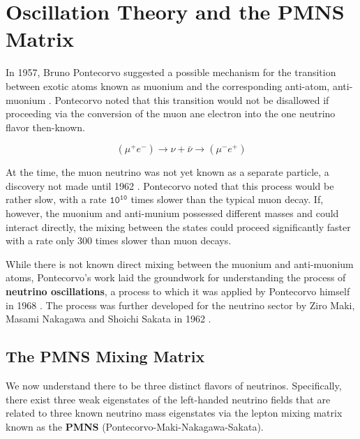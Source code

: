 \section{Oscillation Theory and the PMNS Matrix}

In 1957, Bruno Pontecorvo suggested a possible mechanism for the transition between exotic atoms known as muonium and the corresponding anti-atom, anti-muonium \cite{Pontecorvo-Mesonium}.
Pontecorvo noted that this transition would not be disallowed if proceeding via the conversion of the muon ane electron into the one neutrino flavor then-known.

\begin{equation}
   \left(\mu^+ e^-\right) \rightarrow \nu + \bar{\nu} \rightarrow \left(\mu^- e^+\right)
\end{equation}

At the time, the muon neutrino was not yet known as a separate particle, a discovery not made until 1962 \cite{Danby-NuMu}.
Pontecorvo noted that this process would be rather slow, with a rate $\mathtt{10^{10}}$ times slower than the typical muon decay. 
If, however, the muonium and anti-munium possessed different masses and could interact directly, the mixing between the states could proceed significantly faster with a rate only 300 times slower than muon decays.

While there is not known direct mixing between the muonium and anti-muonium atoms, Pontecorvo's work laid the groundwork for understanding the process of \textbf{neutrino oscillations}, a process to which it was applied by Pontecorvo himself in 1968 \cite{Pontecorvo-Oscillations}.
The process was further developed for the neutrino sector by Ziro Maki, Masami Nakagawa and Shoichi Sakata in 1962 \cite{Maki-Nakagawa-Sakata}.

\subsection{The PMNS Mixing Matrix}

We now understand there to be three distinct flavors of neutrinos.
Specifically, there exist three weak eigenstates of the left-handed neutrino fields that are related to three known neutrino mass eigenstates via the lepton mixing matrix known as the \textbf{PMNS} (Pontecorvo-Maki-Nakagawa-Sakata).

